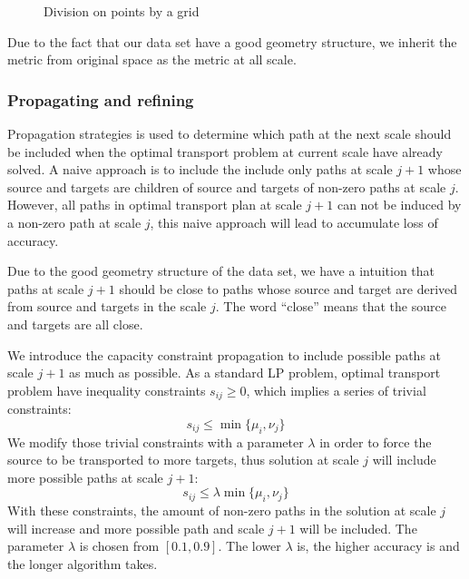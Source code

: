 \documentclass[english]{pkupaper}
\begin{document}
\begin{figure}
\centering
\scalebox{0.4}{}
\scalebox{0.4}{}  
\caption{Division on points by a grid} \label{Fig:Div}
\end{figure}

Due to the fact that our data set have a good geometry structure, we inherit the metric from original space as the metric at all scale.

\subsubsection{Propagating and refining}

Propagation strategies is used to determine which path at the next scale should be included when the optimal transport problem at current scale have already solved. A naive approach is to include the include only paths at scale $j+1$ whose source and targets are children of source and targets of non-zero paths at scale $j$. However, all paths in optimal transport plan at scale $j+1$ can not be induced by a non-zero path at scale $j$, this naive approach will lead to accumulate loss of accuracy.

Due to the good geometry structure of the data set, we have a intuition that paths at scale $j+1$ should be close to paths whose source and target are derived from source and targets in the scale $j$. The word ``close'' means that the source and targets are all close.

We introduce the capacity constraint propagation to include possible paths at scale $j+1$ as much as possible. As a standard LP problem, optimal transport problem have inequality constraints $s_{ij}\geq 0$, which implies a series of trivial constraints:
\begin{equation}
s_{ij} \leq \min\{\mu_i, \nu_j\}
\end{equation}
We modify those trivial constraints with a parameter $\lambda$ in order to force the source to be transported to more targets, thus solution at scale $j$ will include more possible paths at scale $j+1$:
\begin{equation}
s_{ij}\leq \lambda\min\{\mu_i, \nu_j\}
\end{equation}
With these constraints, the amount of non-zero paths in the solution at scale $j$ will increase and more possible path and scale $j+1$ will be included. The parameter $\lambda$ is chosen from $[0.1, 0.9]$. The lower $\lambda$ is, the higher accuracy is and the longer algorithm takes.
\end{document}
